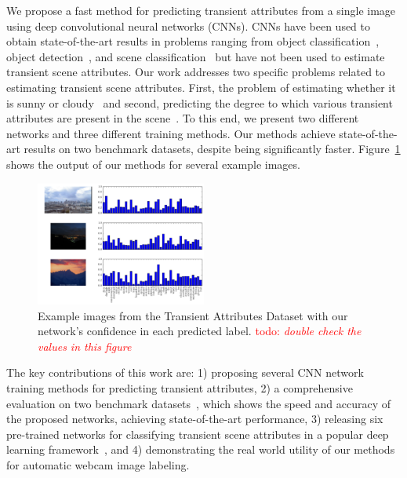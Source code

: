 \documentclass[10pt,twocolumn,letterpaper]{article}
\newcommand{\todo}[1]{\textcolor{red}{todo: {\em #1}}}
\newcommand{\figref}[1]{Figure~\ref{fig:#1}}
\begin{document}

We propose a fast method for predicting transient attributes from a single image
using deep convolutional neural networks (CNNs). CNNs have been used to
obtain state-of-the-art results in problems ranging from object
classification~\cite{krizhevsky2012imagenet}, object
detection~\cite{girshick2013rich}, and scene
classification~\cite{zhou2014places} but have not been used to estimate
transient scene attributes. Our work addresses two specific problems
related to estimating transient scene attributes. First, the problem of
estimating whether it is sunny or cloudy~\cite{lutwoclass} and second,
predicting the degree to which various transient attributes are
present in the scene~\cite{Laffont14}. To this end, we present two
different networks and three different training methods. Our methods
achieve state-of-the-art results on two benchmark datasets, despite
being significantly faster. \figref{results} shows the output of our
methods for several example images.


\begin{figure}
	\centering
		\includegraphics[width=0.5\textwidth]{figs/bars.pdf}
		\caption{Example images from the Transient Attributes Dataset
      with our network's confidence in each predicted label.
      \todo{double check the values in this figure}}
    \label{fig:results}
\end{figure}


The key contributions of this work are: 1) proposing several CNN
network training methods for predicting transient attributes, 2) a
comprehensive evaluation on two benchmark
datasets~\cite{lutwoclass,Laffont14}, which shows the speed and
accuracy of the proposed networks, achieving state-of-the-art
performance, 3) releasing six pre-trained networks for classifying
transient scene attributes in a popular deep learning
framework~\cite{caffe14}, and 4) demonstrating the real world utility
of our methods for automatic webcam image labeling. 
\end{document}
